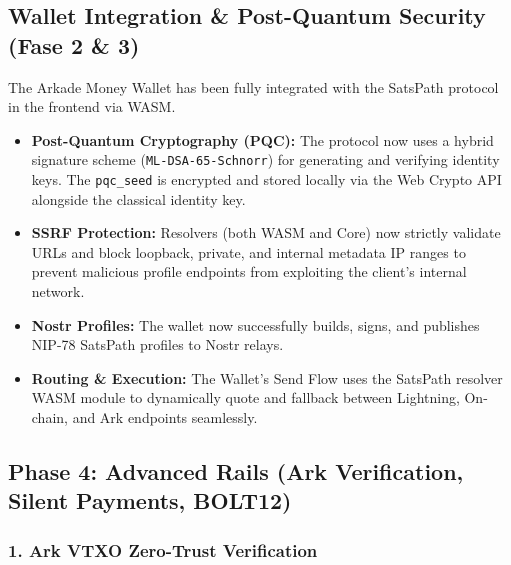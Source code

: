 \documentclass[
]{article}
\providecommand{\tightlist}{%
  \setlength{\itemsep}{0pt}\setlength{\parskip}{0pt}}
\begin{document}
\hypertarget{wallet-integration-post-quantum-security-fase-2-3}{%
\subsection{Wallet Integration \& Post-Quantum Security (Fase 2 \&
3)}\label{wallet-integration-post-quantum-security-fase-2-3}}

The Arkade Money Wallet has been fully integrated with the SatsPath
protocol in the frontend via WASM.

\begin{itemize}
\tightlist
\item
  \textbf{Post-Quantum Cryptography (PQC):} The protocol now uses a
  hybrid signature scheme (\texttt{ML-DSA-65-Schnorr}) for generating
  and verifying identity keys. The \texttt{pqc\_seed} is encrypted and
  stored locally via the Web Crypto API alongside the classical identity
  key.
\item
  \textbf{SSRF Protection:} Resolvers (both WASM and Core) now strictly
  validate URLs and block loopback, private, and internal metadata IP
  ranges to prevent malicious profile endpoints from exploiting the
  client's internal network.
\item
  \textbf{Nostr Profiles:} The wallet now successfully builds, signs,
  and publishes NIP-78 SatsPath profiles to Nostr relays.
\item
  \textbf{Routing \& Execution:} The Wallet's Send Flow uses the
  SatsPath resolver WASM module to dynamically quote and fallback
  between Lightning, On-chain, and Ark endpoints seamlessly.
\end{itemize}

\hypertarget{phase-4-advanced-rails-ark-verification-silent-payments-bolt12}{%
\subsection{Phase 4: Advanced Rails (Ark Verification, Silent Payments,
BOLT12)}\label{phase-4-advanced-rails-ark-verification-silent-payments-bolt12}}

\hypertarget{ark-vtxo-zero-trust-verification}{%
\subsubsection{1. Ark VTXO Zero-Trust
Verification}\label{ark-vtxo-zero-trust-verification}}
\end{document}

